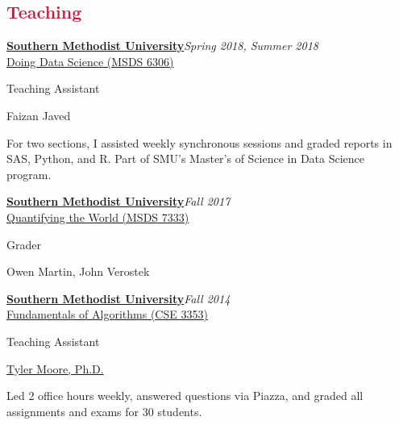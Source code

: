 \documentclass[margin, 10pt]{res} %
\newcommand{\Year}[1]{\emph{#1}}
\newcommand{\uni}[1]{\textbf{#1}}
\newcommand{\eventYear}[2]{\uni{#1}\hfill{\Year{#2}}\\}
\let\oldsection\section
\renewcommand{\section}[1]{\oldsection{\textcolor{crimson}{#1}}}
\newcommand{\SMU}{\href{https://www.smu.edu/}{Southern Methodist University}}
\begin{document}
\begin{resume}
\vspace{10em}

\section{Teaching}

\begin{samepage}
\eventYear{\SMU}{Spring 2018, Summer 2018}
\href{https://datascience.smu.edu/academics/curriculum/coursedescriptions/#data-science}{Doing Data Science (MSDS 6306)}
\begin{description}[noitemsep, labelindent=1em]
\item[Role:] Teaching Assistant
\item[Professor:] Faizan Javed
\item For two sections, I assisted weekly synchronous sessions and graded reports in SAS, Python, and R. Part of SMU's Master's of Science in Data Science program.
\end{description}
\end{samepage}

\begin{samepage}
\eventYear{\SMU}{Fall 2017}
\href{https://datascience.smu.edu/academics/curriculum/coursedescriptions/#quantifying}{Quantifying the World (MSDS 7333)}
\begin{description}[noitemsep, labelindent=1em]
\item[Role:] Grader
\item[Professor:] Owen Martin, John Verostek
\end{description}
\end{samepage}

\begin{samepage}
\eventYear{\SMU}{Fall 2014}
\href{https://tylermoore.ens.utulsa.edu/courses/cse3353/}{Fundamentals of Algorithms (CSE 3353)}
\begin{description}[noitemsep, labelindent=1em]
\item[Role:] Teaching Assistant
\item[Professor:] \href{https://tylermoore.ens.utulsa.edu}{Tyler Moore, Ph.D.}
\item Led 2 office hours weekly, answered questions via Piazza, and graded all assignments and exams for 30 students.
\end{description}
\end{samepage}




\end{resume}
\end{document}
